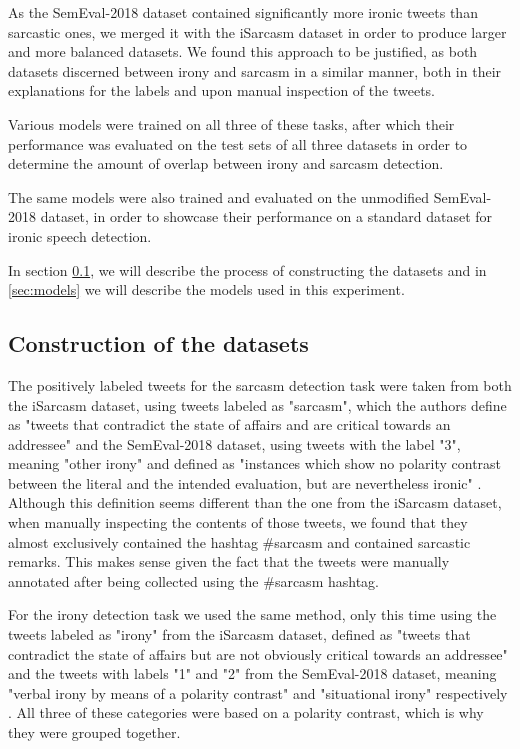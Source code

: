 \documentclass[10pt, a4paper]{article}
\begin{document}
As the SemEval-2018 dataset contained significantly more
ironic tweets than sarcastic ones, we merged it with the iSarcasm dataset in order to produce larger and more balanced datasets.
We found this approach to be justified, as both datasets discerned between irony and sarcasm in a similar manner, both in
their explanations for the labels and upon manual inspection of the tweets. 

Various models were trained on all three of these tasks, after which their performance was evaluated on the test sets of all
three datasets in order to determine the amount of overlap between irony and sarcasm detection.

The same models were also trained and evaluated on the unmodified SemEval-2018 dataset, in order to showcase their performance
on a standard dataset for ironic speech detection.

In section \ref{sec:dataset_construction}, we will describe the process of constructing the datasets and in \ref{sec:models}
we will describe the models used in this experiment.

\subsection{Construction of the datasets}\label{sec:dataset_construction}

The positively labeled tweets for the sarcasm detection task were taken from both the iSarcasm dataset, using tweets labeled
as "sarcasm", which the authors define as "tweets that contradict the state of affairs and are critical towards an addressee"
\citep{iSarcasm} and the SemEval-2018 dataset, using tweets with the label "3", meaning "other irony" and defined as "instances
which show no polarity contrast between the literal and the intended evaluation, but are nevertheless ironic" 
\citep{semeval-2018}. Although this definition seems different than the one from the iSarcasm dataset, when manually
inspecting the contents of those tweets, we found that they almost exclusively contained the hashtag \#sarcasm and contained
sarcastic remarks. This makes sense given the fact that the tweets were manually annotated after being collected using the
\#sarcasm hashtag.

For the irony detection task we used the same method, only this time using the tweets labeled as "irony" from the iSarcasm
dataset, defined as "tweets that contradict the state of affairs but are not obviously critical towards an
addressee" \citep{iSarcasm} and the tweets with labels "1" and "2" from the SemEval-2018 dataset, meaning "verbal irony by means 
of a polarity contrast" and "situational irony" respectively \citep{semeval-2018}. All three of these categories were based
on a polarity contrast, which is why they were grouped together.
\end{document}
